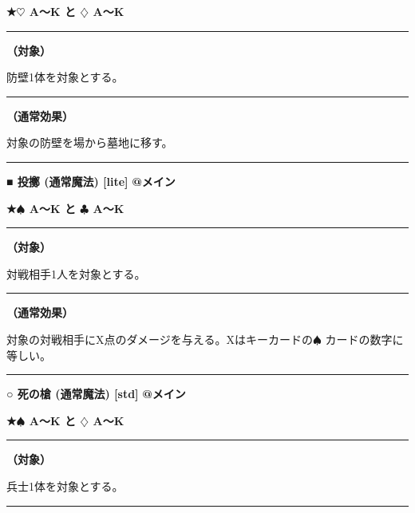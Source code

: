 \documentclass[twocolumn,a5paper,papersize,10pt]{jarticle}
\begin{document}
{\footnotesize\bf ★{\normalsize $\heartsuit$} A〜K と {\normalsize $\diamondsuit$} A〜K}

\vspace{1mm}%
\hrule height 0.1mm depth 0mm width 66.5mm %
\vspace{1mm}%
{\bf（対象）}

防壁1体を対象とする。
\vspace{1mm}%
\hrule height 0.1mm depth 0mm width 66.5mm %
\vspace{1mm}%

{\bf（通常効果）}

対象の防壁を場から墓地に移す。
\vspace{2mm} %
\hrule height 0.5mm depth 0mm width 66.5mm %
\vspace{1mm} %
{\small\bf ■ 投擲 {\scriptsize (通常魔法) [lite]}} %
\hfill 
{\footnotesize\bf @メイン }

{\footnotesize\bf ★{\normalsize $\spadesuit$} A〜K と {\normalsize $\clubsuit$} A〜K}

\vspace{1mm}%
\hrule height 0.1mm depth 0mm width 66.5mm %
\vspace{1mm}%
{\bf（対象）}

対戦相手1人を対象とする。
\vspace{1mm}%
\hrule height 0.1mm depth 0mm width 66.5mm %
\vspace{1mm}%

{\bf（通常効果）}

対象の対戦相手にX点のダメージを与える。Xはキーカードの{\normalsize $\spadesuit$} カードの数字に等しい。
\vspace{2mm} %
\hrule height 0.5mm depth 0mm width 66.5mm %
\vspace{1mm} %
{\small\bf ○ 死の槍 {\scriptsize (通常魔法) [std]}} %
\hfill 
{\footnotesize\bf @メイン }

{\footnotesize\bf ★{\normalsize $\spadesuit$} A〜K と {\normalsize $\diamondsuit$} A〜K}

\vspace{1mm}%
\hrule height 0.1mm depth 0mm width 66.5mm %
\vspace{1mm}%
{\bf（対象）}

兵士1体を対象とする。
\vspace{1mm}%
\hrule height 0.1mm depth 0mm width 66.5mm %
\vspace{1mm}%
\end{document}
